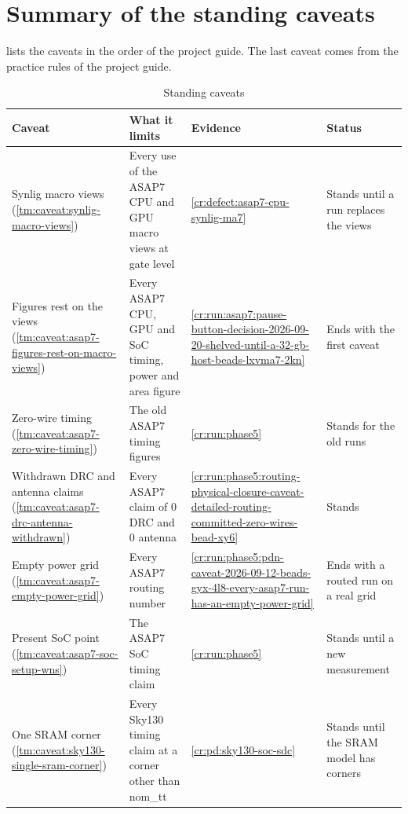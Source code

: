 \section{Summary of the standing caveats}\label{tm:ch:tool-defects-and-caveats:caveat-summary}
 lists the caveats in the order of the project guide. The last caveat comes from the practice rules of the project guide.

\begin{table}[ht]
  \centering
  \caption{Standing caveats}\label{tab:tm:ch:tool-defects-and-caveats:caveats}
  \begin{tabular}{@{}>{\raggedright\arraybackslash}p{32mm}>{\raggedright\arraybackslash}p{44mm}>{\raggedright\arraybackslash}p{34mm}>{\raggedright\arraybackslash}p{32mm}@{}}
    \toprule
    Caveat & What it limits & Evidence & Status\\
    \midrule
    Synlig macro views (\cref{tm:caveat:synlig-macro-views}) & Every use of the ASAP7 CPU and GPU macro views at gate level & \cref{cr:defect:asap7-cpu-synlig-ma7} & Stands until a run replaces the views\\
    Figures rest on the views (\cref{tm:caveat:asap7-figures-rest-on-macro-views}) & Every ASAP7 CPU, GPU and SoC timing, power and area figure & \cref{cr:run:asap7:pause-button-decision-2026-09-20-shelved-until-a-32-gb-host-beads-lxvma7-2kn} & Ends with the first caveat\\
    Zero-wire timing (\cref{tm:caveat:asap7-zero-wire-timing}) & The old ASAP7 timing figures & \cref{cr:run:phase5} & Stands for the old runs\\
    Withdrawn DRC and antenna claims (\cref{tm:caveat:asap7-drc-antenna-withdrawn}) & Every ASAP7 claim of 0 DRC and 0 antenna & \cref{cr:run:phase5:routing-physical-closure-caveat-detailed-routing-committed-zero-wires-bead-xy6} & Stands\\
    Empty power grid (\cref{tm:caveat:asap7-empty-power-grid}) & Every ASAP7 routing number & \cref{cr:run:phase5:pdn-caveat-2026-09-12-beads-gyx-4l8-every-asap7-run-has-an-empty-power-grid} & Ends with a routed run on a real grid\\
    Present SoC point (\cref{tm:caveat:asap7-soc-setup-wns}) & The ASAP7 SoC timing claim & \cref{cr:run:phase5} & Stands until a new measurement\\
    One SRAM corner (\cref{tm:caveat:sky130-single-sram-corner}) & Every Sky130 timing claim at a corner other than nom\_tt & \cref{cr:pd:sky130-soc-sdc} & Stands until the SRAM model has corners\\

\end{tabular}
\end{table}
